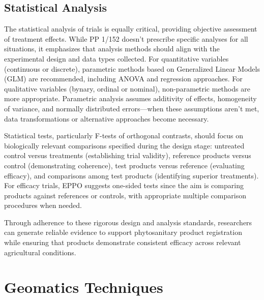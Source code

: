 \documentclass[12pt,a4paper,oneside]{report}
\begin{document}
\subsection{Statistical Analysis}

The statistical analysis of trials is equally critical, providing objective 
assessment of treatment effects. While PP 1/152 \cite{EPPO_PP1_152} doesn't prescribe 
specific analyses for all situations, it emphasizes that analysis methods should 
align with the experimental design and data types collected. For quantitative 
variables (continuous or discrete), parametric methods based on Generalized 
Linear Models (GLM) are recommended, including ANOVA and regression approaches. 
For qualitative variables (bynary, ordinal or nominal), non-parametric methods are more 
appropriate. Parametric analysis assumes additivity of effects, homogeneity of variance, 
and normally distributed errors—when these assumptions aren't met, data transformations 
or alternative approaches become necessary.

Statistical tests, particularly F-tests of orthogonal 
contrasts, should focus on biologically relevant comparisons specified during the 
design stage: untreated control versus treatments (establishing trial validity), 
reference products versus control (demonstrating coherence), test products versus 
reference (evaluating efficacy), and comparisons among test products (identifying 
superior treatments). For efficacy trials, EPPO suggests one-sided tests since the 
aim is comparing products against references or controls, with appropriate multiple 
comparison procedures when needed.

Through adherence to these rigorous design and analysis standards, researchers can 
generate reliable evidence to support phytosanitary product registration while ensuring 
that products demonstrate consistent efficacy across relevant agricultural conditions.

\section{Geomatics Techniques}
\end{document}
